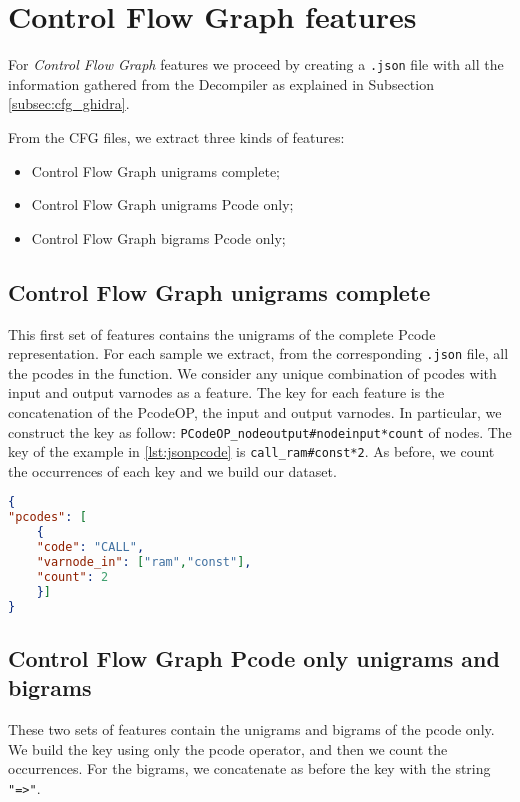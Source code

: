 \section{Control Flow Graph features}
For \textit{Control Flow Graph} features we proceed by creating a \texttt{.json} file with all the information gathered from the Decompiler as explained in Subsection \ref{subsec:cfg_ghidra}.

From the CFG files, we extract three kinds of features:
\begin{itemize}
	\item {Control Flow Graph unigrams complete;}
	\item {Control Flow Graph unigrams Pcode only;}
	\item {Control Flow Graph bigrams Pcode only;}
\end{itemize}

\subsection{Control Flow Graph unigrams complete}
This first set of features contains the unigrams of the complete Pcode representation.
For each sample we extract, from the corresponding \texttt{.json} file, all the pcodes in the function. We consider any unique combination of pcodes with input and output varnodes as a feature.
The key for each feature is the concatenation of the PcodeOP, the input and output varnodes. In particular, we construct the key as follow:
\texttt{PCodeOP\_nodeoutput\#nodeinput*count} of nodes.
The key of the example in \ref{lst:jsonpcode} is \texttt{call\_ram\#const*2}. As before, we count the occurrences of each key and we build our dataset.

\clearpage
\begin{lstlisting}[language=json,firstnumber=1,caption={Example of .json format with PCode},label={lst:jsonpcode}]
{
"pcodes": [
	{
	"code": "CALL",
	"varnode_in": ["ram","const"],
	"count": 2 
	}]
}
\end{lstlisting}



\subsection{Control Flow Graph Pcode only unigrams and bigrams}

These two sets of features contain the unigrams and bigrams of the pcode only. We build the key using only the pcode operator, and then we count the occurrences. For the bigrams, we concatenate as before the key with the string \texttt{"=>"}.

